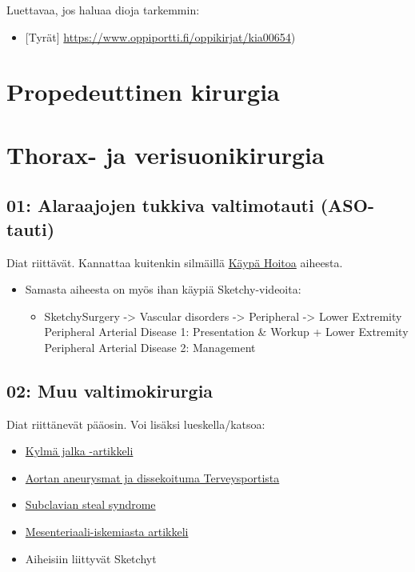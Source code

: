 \documentclass[
]{book}
\providecommand{\tightlist}{%
  \setlength{\itemsep}{0pt}\setlength{\parskip}{0pt}}
\begin{document}
Luettavaa, jos haluaa dioja tarkemmin:

\begin{itemize}
\tightlist
\item
  {[}Tyrät{]} \url{https://www.oppiportti.fi/oppikirjat/kia00654})
\end{itemize}

\section{Propedeuttinen kirurgia}\label{propedeuttinen-kirurgia}

\section{Thorax- ja verisuonikirurgia}\label{thorax--ja-verisuonikirurgia}

\subsection{01: Alaraajojen tukkiva valtimotauti (ASO-tauti)}\label{alaraajojen-tukkiva-valtimotauti-aso-tauti}

Diat riittävät. Kannattaa kuitenkin silmäillä \href{https://www.kaypahoito.fi/hoi50083}{Käypä Hoitoa} aiheesta.

\begin{itemize}
\item
  Samasta aiheesta on myös ihan käypiä Sketchy-videoita:

  \begin{itemize}
  \tightlist
  \item
    SketchySurgery -\textgreater{} Vascular disorders -\textgreater{} Peripheral -\textgreater{} Lower Extremity Peripheral Arterial Disease 1: Presentation \& Workup + Lower Extremity Peripheral Arterial Disease 2: Management
  \end{itemize}
\end{itemize}

\subsection{02: Muu valtimokirurgia}\label{muu-valtimokirurgia}

Diat riittänevät pääosin. Voi lisäksi lueskella/katsoa:

\begin{itemize}
\tightlist
\item
  \href{https://trepo.tuni.fi/bitstream/handle/10024/222111/duo16892.pdf}{Kylmä jalka -artikkeli}
\item
  \href{https://www.terveysportti.fi/apps/dtk/ltk/article/ykt00159}{Aortan aneurysmat ja dissekoituma Terveysportista}
\item
  \href{https://youtu.be/ry5fB1kMwyY?si=YYM8j-NQj2Ws_wNN}{Subclavian steal syndrome}
\item
  \href{https://www.terveysportti.fi/apps/dtk/ltk/article/sll51002/}{Mesenteriaali-iskemiasta artikkeli}
\item
  Aiheisiin liittyvät Sketchyt
\end{itemize}
\end{document}
